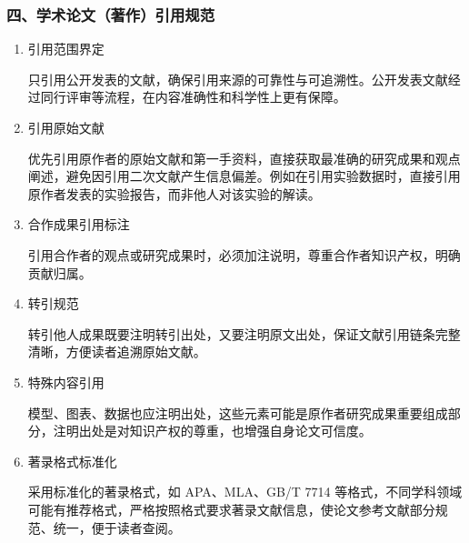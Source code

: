 \subsubsection*{四、学术论文（著作）引用规范}
\begin{enumerate}
  \item 引用范围界定

  只引用公开发表的文献，确保引用来源的可靠性与可追溯性。公开发表文献经过同行评审等流程，在内容准确性和科学性上更有保障。

  \item 引用原始文献

  优先引用原作者的原始文献和第一手资料，直接获取最准确的研究成果和观点阐述，避免因引用二次文献产生信息偏差。例如在引用实验数据时，直接引用原作者发表的实验报告，而非他人对该实验的解读。

  \item 合作成果引用标注

  引用合作者的观点或研究成果时，必须加注说明，尊重合作者知识产权，明确贡献归属。

  \item 转引规范

  转引他人成果既要注明转引出处，又要注明原文出处，保证文献引用链条完整清晰，方便读者追溯原始文献。

  \item 特殊内容引用

  模型、图表、数据也应注明出处，这些元素可能是原作者研究成果重要组成部分，注明出处是对知识产权的尊重，也增强自身论文可信度。

  \item 著录格式标准化

  采用标准化的著录格式，如 APA、MLA、GB/T 7714 等格式，不同学科领域可能有推荐格式，严格按照格式要求著录文献信息，使论文参考文献部分规范、统一，便于读者查阅。

\end{enumerate}
